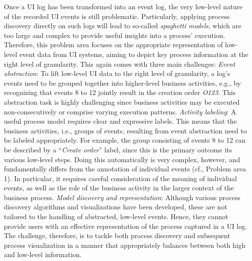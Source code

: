 Once a UI log has been transformed into an event log, the very low-level nature of the recorded UI events is still problematic. Particularly, applying process discovery directly on such logs will lead to so-called \emph{spaghetti models}, which are too large and complex to provide useful insights into a process' execution.
Therefore, this problem area focuses on the appropriate representation of low-level event data from UI systems, aiming to depict key process information at the right level of granularity. This again comes with three main challenges: 
\vspace{0.2em}
\newline%
\noindent\textit{Event abstraction}: To lift low-level UI data to the right level of granularity, a log's events need to be grouped together into higher-level business activities, e.g., by recognizing that events 8 to 12 jointly result in the creation order \emph{O123}. This abstraction task is highly challenging since business activities may be executed non-consecutively or comprise varying execution patterns.
\vspace{0.2em}
\newline%
\noindent \textit{Activity labeling}: A useful process model requires clear and expressive labels. 
This means that the business activities, i.e., groups of events,  resulting from event abstraction need to be labeled appropriately. For example, the group consisting of events 8 to 12 can be described by a ``\textit{Create order}'' label, since this is the primary outcome its various low-level steps. Doing this automatically is very complex, however, and fundamentally differs from the annotation of individual events (cf., Problem area 1). In particular, it requires careful consideration of the meaning of individual events, as well as the role of the business activity in the larger context of the business process.
 \vspace{0.2em}
 \newline%
\noindent \textit{Model discovery and representation}: 
Although various process discovery algorithms and visualizations have been developed, these are not tailored to the handling of abstracted, low-level events. Hence, they cannot provide users with an effective representation of the process captured in a UI log.  The challenge, therefore, is to tackle both process discovery and  subsequent process visualization in a manner that appropriately balances between both high and low-level information.

